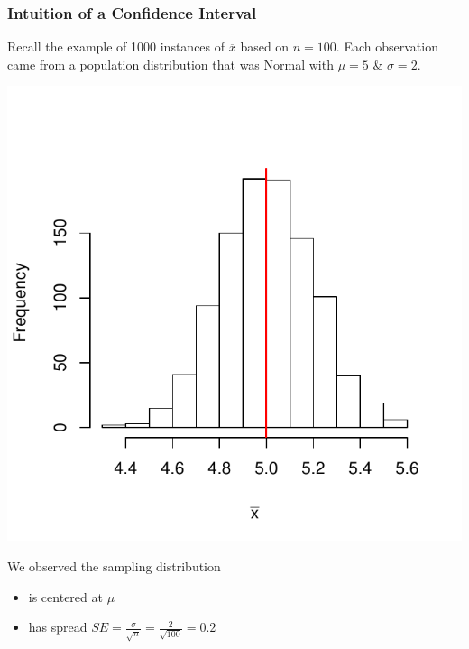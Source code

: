 \documentclass[handout]{beamer}
\newcommand{\xbar}{\overline{x}}
\begin{document}
\begin{frame}[fragile]
\frametitle{Intuition of a Confidence Interval}
Recall the example of 1000 instances of $\xbar$ based on $n=100$.  Each observation came from a population distribution that was Normal with $\mu=5$ \& $\sigma=2$.  

\pause {}
\begin{center}
\includegraphics{figure/lec12-001}
\end{center}

\pause We observed the sampling distribution
\begin{itemize}
\item is centered at $\mu$
\item has spread $SE = \frac{\sigma}{\sqrt n} = \frac{2}{\sqrt{100}} = 0.2$
\end{itemize}

\end{frame}
\end{document}
